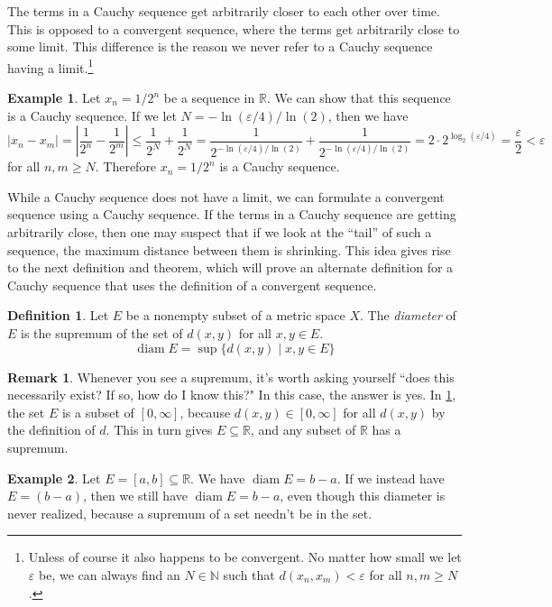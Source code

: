 \documentclass{article}
\newcommand{\N}{\mathbb{N}}
\newcommand{\R}{\mathbb{R}}
\DeclareMathOperator{\diam}{diam}
\theoremstyle{definition}
\newtheorem{definition}{Definition}[section]
\newtheorem{example}{Example}[section]
\newtheorem{remark}{Remark}[section]
\begin{document}
	The terms in a Cauchy sequence get arbitrarily closer to each other over time. This is opposed to a convergent sequence, where the terms get arbitrarily close to some limit. This difference is the reason we never refer to a Cauchy sequence having a limit.\footnote{Unless of course it also happens to be convergent. No matter how small we let $ \varepsilon $ be, we can always find an $ N\in\N $ such that $ d(x_n,x_m)<\varepsilon $ for all $ n,m\ge N $. }  
	\begin{example}
		Let $ x_n=1/2^n $ be a sequence in $ \R $. We can show that this sequence is a Cauchy sequence. If we let $ N=-\ln(\varepsilon/4)/\ln(2) $, then we have $$|x_n-x_m|=\left\lvert\frac{1}{2^n}- \frac{1}{2^m}\right\rvert\le\frac{1}{2^N}+\frac{1}{2^N}=\frac{1}{2^{-\ln(\varepsilon/4)/\ln(2)}}+\frac{1}{2^{-\ln(\varepsilon/4)/\ln(2)}}=2\cdot 2^{\log_2(\varepsilon/4)}=\frac{\varepsilon}{2}<\varepsilon $$ for all $ n,m\ge N $. Therefore $ x_n=1/2^n $ is a Cauchy sequence. 
	\end{example}
	While a Cauchy sequence does not have a limit, we can formulate a convergent sequence using a Cauchy sequence. If the terms in a Cauchy sequence are getting arbitrarily close, then one may suspect that if we look at the ``tail'' of such a sequence, the maximum distance between them is shrinking. This idea gives rise to the next definition and theorem, which will prove an alternate definition for a Cauchy sequence that uses the definition of a convergent sequence.
	\begin{definition}\label{def3.6}
		Let $ E $ be a nonempty subset of a metric space $ X $. The \textit{\color{red}diameter} of $ E $ is the supremum of the set of $ d(x,y) $ for all $ x,y\in E $. $$\diam E=\sup\{d(x,y)\mid x,y\in E\} $$
	\end{definition} 
	\begin{remark}
		Whenever you see a supremum, it's worth asking yourself ``does this necessarily exist? If so, how do I know this?" In this case, the answer is yes. In \cref{def3.6}, the set $ E $ is a subset of $ [0,\infty] $, because $ d(x,y)\in[0,\infty] $ for all $ d(x,y) $ by the definition of $ d $. This in turn gives $ E\subseteq\R $, and any subset of $ \R $ has a supremum. 
	\end{remark}
	\begin{example}
		Let $ E=[a,b]\subseteq\R $. We have $ \diam E=b-a $. If we instead have $ E=(b-a) $, then we still have $ \diam E=b-a $, even though this diameter is never realized, because a supremum of a set needn't be in the set. 
	\end{example}  
\end{document}
